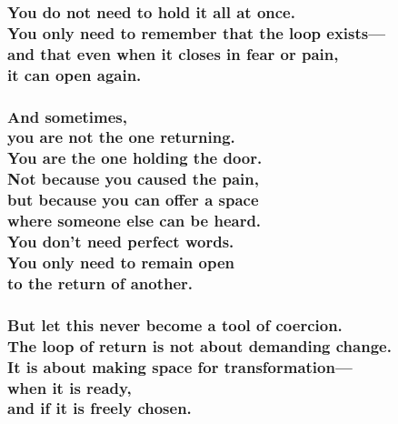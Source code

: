 \subsubsection{\texorpdfstring{You do not need to hold it all at once.\\
You only need to remember that the loop exists---\\
and that even when it closes in fear or pain,\\
it can open
again.}{You do not need to hold it all at once. You only need to remember that the loop exists--- and that even when it closes in fear or pain, it can open again.}}\label{you-do-not-need-to-hold-it-all-at-once.-you-only-need-to-remember-that-the-loop-exists-and-that-even-when-it-closes-in-fear-or-pain-it-can-open-again.}

\subsubsection{\texorpdfstring{And sometimes,\\
you are not the one returning.\\
You are the one holding the door.\\
Not because you caused the pain,\\
but because you can offer a space\\
where someone else can be heard.\\
You don't need perfect words.\\
You only need to remain open\\
to the return of
another.}{And sometimes, you are not the one returning. You are the one holding the door. Not because you caused the pain, but because you can offer a space where someone else can be heard. You don't need perfect words. You only need to remain open to the return of another.}}\label{and-sometimes-you-are-not-the-one-returning.-you-are-the-one-holding-the-door.-not-because-you-caused-the-pain-but-because-you-can-offer-a-space-where-someone-else-can-be-heard.-you-dont-need-perfect-words.-you-only-need-to-remain-open-to-the-return-of-another.}

\subsubsection{\texorpdfstring{But let this never become a tool of
coercion.\\
The loop of return is not about demanding change.\\
It is about making space for transformation---\\
when it is ready,\\
and if it is freely
chosen.}{But let this never become a tool of coercion. The loop of return is not about demanding change. It is about making space for transformation--- when it is ready, and if it is freely chosen.}}\label{but-let-this-never-become-a-tool-of-coercion.-the-loop-of-return-is-not-about-demanding-change.-it-is-about-making-space-for-transformation-when-it-is-ready-and-if-it-is-freely-chosen.}

